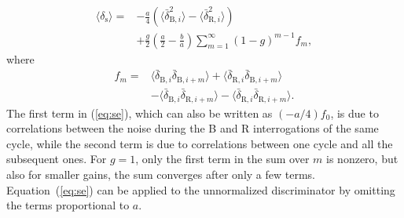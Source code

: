 \documentclass[10pt,a4paper]{iopart}
\newcommand{\eqref}[1]{(\ref{#1})}
\begin{document}
\begin{eqnarray}
\langle \delta_\mathrm{s}\rangle = & - \frac{a}{4} \left( \langle \bar{\delta}_{\mathrm{B},i}^2\rangle - \langle \bar{\delta}_{\mathrm{R},i}^2\rangle \right) \nonumber \\
& + \frac{g}{2} \left( \frac{a}{2} - \frac{b}{a} \right) \sum_{m=1}^\infty (1-g)^{m-1} f_{m},  \label{eq:se}
\end{eqnarray}
where
\begin{eqnarray}
f_{m} = & \langle \bar{\delta}_{\mathrm{B},i} \bar{\delta}_{\mathrm{B},i+m}\rangle
+ \langle \bar{\delta}_{\mathrm{R},i} \bar{\delta}_{\mathrm{B},i+m}\rangle \nonumber \\
& - \langle \bar{\delta}_{\mathrm{B},i} \bar{\delta}_{\mathrm{R},i+m}\rangle
- \langle \bar{\delta}_{\mathrm{R},i} \bar{\delta}_{\mathrm{R},i+m}\rangle. \label{eq:fDm}
\end{eqnarray}
The first term in \eqref{eq:se}, which can also be written as $(-a/4) f_0$, is due to correlations between the noise during the B and R interrogations of the same cycle, while the second term is due to correlations between one cycle and all the subsequent ones. For $g=1$, only the first term in the sum over $m$ is nonzero, but also for smaller gains, the sum converges after only a few terms. Equation~\eqref{eq:se} can be applied to the unnormalized discriminator by omitting the terms proportional to $a$.
\end{document}
